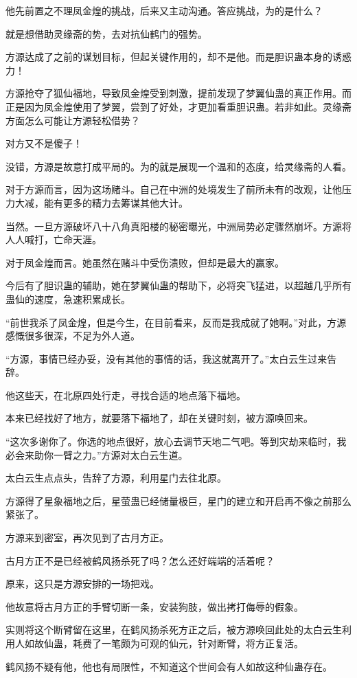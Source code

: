 \begin{this_body}
他先前置之不理凤金煌的挑战，后来又主动沟通。答应挑战，为的是什么？

就是想借助灵缘斋的势，去对抗仙鹤门的强势。

方源达成了之前的谋划目标，但起关键作用的，却不是他。而是胆识蛊本身的诱惑力！

方源抢夺了狐仙福地，导致凤金煌受到刺激，提前发现了梦翼仙蛊的真正作用。而正是因为凤金煌使用了梦翼，尝到了好处，才更加看重胆识蛊。若非如此。灵缘斋方面怎么可能让方源轻松借势？

对方又不是傻子！

没错，方源是故意打成平局的。为的就是展现一个温和的态度，给灵缘斋的人看。

对于方源而言，因为这场赌斗。自己在中洲的处境发生了前所未有的改观，让他压力大减，能有更多的精力去筹谋其他大计。

当然。一旦方源破坏八十八角真阳楼的秘密曝光，中洲局势必定骤然崩坏。方源将人人喊打，亡命天涯。

对于凤金煌而言。她虽然在赌斗中受伤溃败，但却是最大的赢家。

今后有了胆识蛊的辅助，她在梦翼仙蛊的帮助下，必将突飞猛进，以超越几乎所有蛊仙的速度，急速积累成长。

“前世我杀了凤金煌，但是今生，在目前看来，反而是我成就了她啊。”对此，方源感慨很多很深，不足为外人道。

“方源，事情已经办妥，没有其他的事情的话，我这就离开了。”太白云生过来告辞。

他这些天，在北原四处行走，寻找合适的地点落下福地。

本来已经找好了地方，就要落下福地了，却在关键时刻，被方源唤回来。

“这次多谢你了。你选的地点很好，放心去调节天地二气吧。等到灾劫来临时，我必会来助你一臂之力。”方源对太白云生道。

太白云生点点头，告辞了方源，利用星门去往北原。

方源得了星象福地之后，星萤蛊已经储量极巨，星门的建立和开启再不像之前那么紧张了。

方源来到密室，再次见到了古月方正。

古月方正不是已经被鹤风扬杀死了吗？怎么还好端端的活着呢？

原来，这只是方源安排的一场把戏。

他故意将古月方正的手臂切断一条，安装狗肢，做出拷打侮辱的假象。

实则将这个断臂留在这里，在鹤风扬杀死方正之后，被方源唤回此处的太白云生利用人如故仙蛊，耗费了一笔颇为可观的仙元，针对断臂，将方正复活。

鹤风扬不疑有他，他也有局限性，不知道这个世间会有人如故这种仙蛊存在。


\end{this_body}
